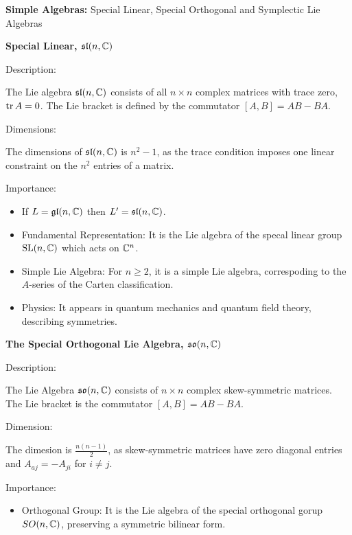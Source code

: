\documentclass[12pt,a4paper]{report}
\begin{document}
\HLINE
\newcommand{\SLC}{\mathfrak{sl}(n,\C)}
\newcommand{\SOC}{\mathfrak{so}(n,\C)}
\newcommand{\SPC}{\mathfrak{sp}(2n,\C)}
\begin{remark}{\textbf{Simple Algebras:} Special Linear, Special Orthogonal and Symplectic Lie Algebras}
\begin{description}
	\item \textbf{Special Linear, $\mathfrak{sl}(n,\mathbb{C})$}
	
	Description:
	
	The Lie algebra $\SLC$ consists of all $n \times n$ complex matrices with trace zero, $\operatorname{tr} A = 0$.  The Lie bracket is defined by the commutator $[A,B]=AB-BA$.
	
	Dimensions:
	
	The dimensions of $\SLC$ is $n^2-1$, as the trace condition imposes one linear constraint on the $n^2$ entries of a matrix.
	
	Importance:
	\begin{itemize}
		\item If $L = \mathfrak{gl}(n,\mathbb{C})$ then $L'= \SLC$.
		\item Fundamental Representation: It is the Lie algebra of the specal linear group $\operatorname{SL}(n,\mathbb{C})$ which acts on $\mathbb{C}^n$.
		\item Simple Lie Algebra: For $n \ge 2$, it is a simple Lie algebra, correspoding to the $A$-series of the Carten classification.
		\item Physics: It appears in quantum mechanics and quantum field theory,  describing symmetries.
	\end{itemize}
	
	\item \textbf{The Special Orthogonal Lie Algebra, $\SOC$}
	
	Description:
	
	The Lie Algebra $\SOC$ consists of $n \times n$ complex skew-symmetric matrices.  The Lie bracket is the commutator $[A,B]=AB-BA$.
	
	Dimension:
	
	The dimesion is $\frac{n(n-1)}{2}$, as skew-symmetric matrices have zero diagonal entries and $A_{aj}=-A_{ji}$ for $i \ne j$.
	
	Importance:
	
	\begin{itemize}
		\item Orthogonal Group:  It is the Lie algebra of the special orthogonal gorup $SO(n,\mathbb{C})$, preserving a symmetric bilinear form.
		

\end{itemize}
\end{description}
\end{remark}
\end{document}

